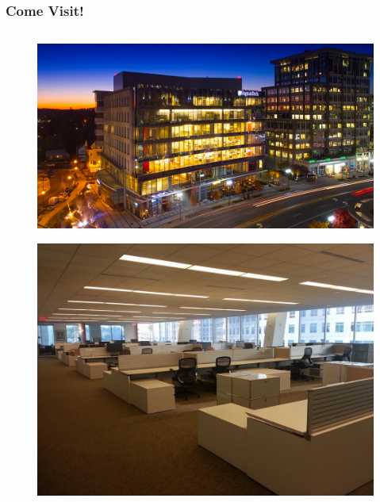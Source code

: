 \documentclass[compress]{beamer}
\begin{document}
	\begin{frame}[Blank] \frametitle{Come Visit!}
		\begin{columns}
			\begin{column}{0.35\textwidth}
				\begin{figure}
					\centering
					\includegraphics[width=1\linewidth]{../figures/metro-lab-big-data-sdal-header}
					\caption{}
					\label{fig:metro-lab-big-data-sdal-header}
				\end{figure}
				
				\begin{figure}
					\centering
					\includegraphics[width=1\linewidth]{../figures/sdal_pit}
					\caption{}
					\label{fig:sdalpit}
				\end{figure}
			\end{column}
						

\end{columns}
\end{frame}
\end{document}
